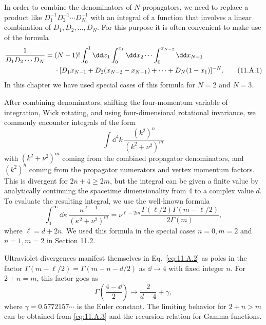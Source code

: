 

In order to combine the denominators of $N$ propagators, we need to replace a
product like $D_1^{-1}D_2^{-1}\cdots D_N^{-1}$ with an integral of a function
that involves a linear combination of $D_1,D_2,\ldots,D_N$. For this purpose
it is often convenient to make use of the formula
\begin{align}
\frac{1}{D_1D_2\cdots D_N}
={}&(N-1)!\int_0^1\dd x_1\int_0^{x_1}\dd x_2\cdots
\int_0^{x_{N-2}}\dd x_{N-1}\notag\\
&\cdot[D_1x_{N-1}+D_2(x_{N-2}-x_{N-1})+\cdots+D_N(1-x_1)]^{-N}.
\tag{11.A.1}\label{eq:11.A.1}
\end{align}
In this chapter we have used special cases of this formula for $N=2$ and
$N=3$.

After combining denominators, shifting the four-momentum variable of
integration, Wick rotating, and using four-dimensional rotational invariance,
we commonly encounter integrals of the form
\[
\int \dd^4k\,\frac{(k^2)^n}{(k^2+\nu^2)^m}
\]
with $(k^2+\nu^2)^m$ coming from the combined propagator denominators, and
$(k^2)^n$ coming from the propagator numerators and vertex momentum factors.
This is divergent for $2n+4\geq2m$, but the integral can be given a finite
value by analytically continuing the spacetime dimensionality from 4 to a
complex value $d$. To evaluate the resulting integral, we use the well-known
formula
\begin{equation}
\int_0^\infty \dd\kappa\,\frac{\kappa^{\ell-1}}{(\kappa^2+\nu^2)^m}
=\nu^{\ell-2m}\frac{\Gamma(\ell/2)\Gamma(m-\ell/2)}{2\Gamma(m)},
\tag{11.A.2}\label{eq:11.A.2}
\end{equation}
where $\ell=d+2n$. We used this formula in the special cases $n=0,m=2$ and
$n=1,m=2$ in Section 11.2.

Ultraviolet divergences manifest themselves in Eq.~\eqref{eq:11.A.2} as poles in the
factor $\Gamma(m-\ell/2)=\Gamma(m-n-d/2)$ as $\dd\to4$ with fixed integer $n$.
For $2+n=m$, this factor goes as
\begin{equation}
\Gamma\left(\frac{4-\dd}{2}\right)\to\frac{2}{d-4}+\gamma,
\tag{11.A.3}\label{eq:11.A.3}
\end{equation}
where $\gamma=0.5772157\cdots$ is the Euler constant. The limiting behavior for
$2+n>m$ can be obtained from \eqref{eq:11.A.3} and the recursion relation for Gamma
functions.
